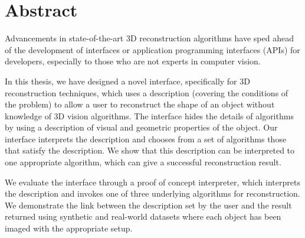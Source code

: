 
\chapter{Abstract}

Advancements in state-of-the-art 3D reconstruction algorithms have sped ahead of the development of interfaces or application programming interfaces (APIs) for developers, especially to those who are not experts in computer vision.

In this thesis, we have designed a novel interface, specifically for 3D reconstruction techniques, which uses a description (covering the conditions of the problem) to allow a user to reconstruct the shape of an object without knowledge of 3D vision algorithms. The interface hides the details of algorithms by using a description of visual and geometric properties of the object. Our interface interprets the description and chooses from a set of algorithms those that satisfy the description. We show that this description can be interpreted to one appropriate algorithm, which can give a successful reconstruction result.

We evaluate the interface through a proof of concept interpreter, which interprets the description and invokes one of three underlying algorithms for reconstruction. We demonstrate the link between the description set by the user and the result returned using synthetic and real-world datasets where each object has been imaged with the appropriate setup.
